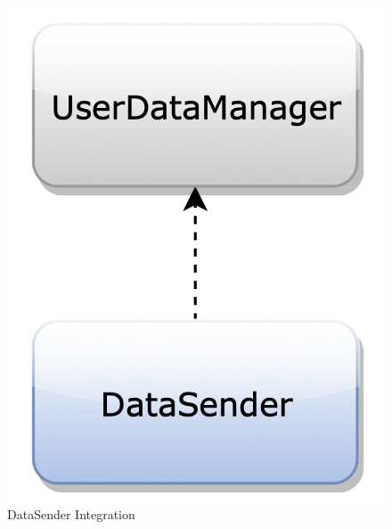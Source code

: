 \begin{figure}[H]
\begin{center}
\begin{minipage}[c]{.40\textwidth}
\includegraphics[scale=0.35]{Images/IntegrationPlanImages/fig8.png}
\caption{DataSender Integration}
        \end{minipage}
      \end{center}
\end{figure}

